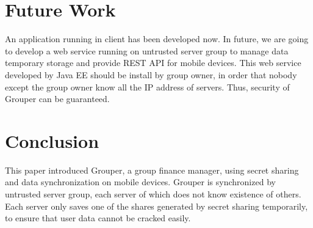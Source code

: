 \documentclass[twocolumn,10pt]{article}
\begin{document}
\section{Future Work}

An application running in client has been developed now. In future, we are going to develop a web service running on untrusted server group to manage data temporary storage and provide REST API for mobile devices. This web service developed by Java EE should be install by group owner, in order that nobody except the group owner know all the IP address of servers. Thus, security of Grouper can be guaranteed.

\section{Conclusion}

This paper introduced Grouper, a group finance manager, using secret sharing and data synchronization on mobile devices. Grouper is synchronized by untrusted server group, each server of which does not know existence of others. Each server only saves one of the shares generated by secret sharing temporarily, to ensure that user data cannot be cracked easily.

{\tiny
\printbibliography
}
\end{document}
